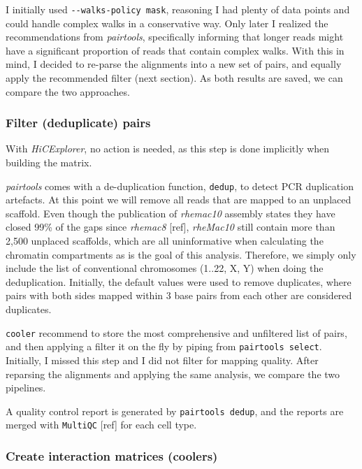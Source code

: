 \documentclass[
  11pt,
  a4paper,
]{scrbook}
\let\oldemph\emph
\renewcommand\emph[1]{\oldemph{\color{gray}#1}}
\begin{document}
\normalsize

I initially used \texttt{-\/-walks-policy\ mask}, reasoning I had plenty
of data points and could handle complex walks in a conservative way.
Only later I realized the recommendations from \emph{pairtools},
specifically informing that longer reads might have a significant
proportion of reads that contain complex walks. With this in mind, I
decided to re-parse the alignments into a new set of pairs, and equally
apply the recommended filter (next section). As both results are saved,
we can compare the two approaches.

\subsubsection{Filter (deduplicate)
pairs}\label{filter-deduplicate-pairs}

With \emph{HiCExplorer}, no action is needed, as this step is done
implicitly when building the matrix.

\emph{pairtools} comes with a de-duplication function, \texttt{dedup},
to detect PCR duplication artefacts. At this point we will remove all
reads that are mapped to an unplaced scaffold. Even though the
publication of \emph{rhemac10} assembly states they have closed 99\% of
the gaps since \emph{rhemac8} {[}ref{]}, \emph{rheMac10} still contain
more than 2,500 unplaced scaffolds, which are all uninformative when
calculating the chromatin compartments as is the goal of this analysis.
Therefore, we simply only include the list of conventional chromosomes
(1..22, X, Y) when doing the deduplication. Initially, the default
values were used to remove duplicates, where pairs with both sides
mapped within 3 base pairs from each other are considered duplicates.

\texttt{cooler} recommend to store the most comprehensive and unfiltered
list of pairs, and then applying a filter it on the fly by piping from
\texttt{pairtools\ select}. Initially, I missed this step and I did not
filter for mapping quality. After reparsing the alignments and applying
the same analysis, we compare the two pipelines.

A quality control report is generated by \texttt{pairtools\ dedup}, and
the reports are merged with \texttt{MultiQC} {[}ref{]} for each cell
type.

\subsubsection{Create interaction matrices
(coolers)}\label{create-interaction-matrices-coolers}
\end{document}
